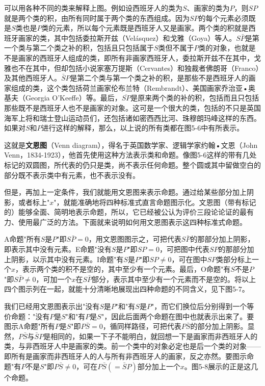 可以用各种不同的类来解释上图。例如设西班牙人的类为$S$、画家的类为$P$，则$SP$就是两个类的积，由所有同时属于两个类的东西组成。因为$SP$的每个元素必须既是$S$类也是$P$类的元素，所以每个元素既是西班牙人又是画家。两个类的积就是西班牙画家的类，其中包括委拉斯开兹（Velásquez）和戈雅（Goya）等人。$S\bar{P}$是第一个类与第二个类之补的积，包括且只包括属于$S$类但不属于$P$类的对象，也就是不是画家的西班牙人组成的类，即所有非画家西班牙人，委拉斯开兹不在其中，戈雅也不在其中，但却包括小说家塞万提斯（Cervantes）和独裁者佛朗哥（Franco）及其他西班牙人。$\bar{S}P$是第二个类与第一个类之补的积，是那些不是西班牙人的画家组成的类，这个类包括荷兰画家伦布兰特（Rembrandt）、美国画家乔治亚•奥基夫（Georgia O'Keeffe）等。最后，$\overline{SP}$是原来两个类的补的积，包括而且只包括那些既不是西班牙人也不是画家的对象。这可是一个很大的类，包括的不只是英国海军上将和瑞士登山运动员们，还包括诸如密西西比河、珠穆朗玛峰这样的东西。如果对$S$和$P$进行这样的解释，那么，以上说的所有类都在图5-6中有所表示。

这就是\textbf{文恩图}（Venn diagram），得名于英国数学家、逻辑学家约翰•文恩（John Venn，1834-1923），他首先使用这种方法表示类和命题。像图5-6这样的带有几处标记的双圆图，所代表的仍只是类，尚不表示任何命题。整个圆或其中留做空白的部分既不表示类中有元素，也不表示没有。

但是，再加上一定条件，我们就能用文恩图来表示命题。通过给某些部分加上阴影，或者标上"$x$"，就能准确地将四种标准式直言命题图示化。文恩图（带有标记的）能够全面、简明地表示命题，所以，它已经被公认为评价三段论论证的最有力、使用最广泛的方法。下面就来说明如何用文恩图表示这四种标准式命题。

A命题"所有$S$是$P$"即$S\bar{P}=0$，用文恩图图示之，可把代表$S\bar{P}$的那部分加上阴影，即表示其中没有元素。E命题"没有$S$是$P$"即$SP=0$，可把图中代表$SP$的那部分加上阴影，以示其中没有元素。I命题"有$S$是$P$"即$SP \neq 0$，可在图中$SP$类部分标上一个$x$，表示两个类的积不是空的，其中至少有一个元素。最后，O命题"有$S$不是$P$"即$S\bar{P} \neq 0$，可加一个$x$在$S\bar{P}$部分，表示其中至少有一个元素而不是空的。将以上四个图示列在一起，就能十分清晰地展现出四种命题的不同含义，见下图5-7。

我们已经用文恩图表示出"没有$S$是$P$"和"有$S$是$P$"，而它们换位后分别得到一个等价命题："没有$P$是$S$"和"有$P$是$S$"，因此后面两个命题在图中也就表示出来了。要图示A命题"所有$P$是$S$"即$P\bar{S}=0$，循同样路径，可把代表$P\bar{S}$的部分加上阴影。显然，$P\bar{S}$与$\bar{S}P$是相同的，如果一下子不能明白，就回想一下是画家而非西班牙人的类，与非西班牙人中是画家的类。前一个类中的对象必定也是后一个类的对象——即所有是画家而非西班牙人的人与所有非西班牙人的画家，反之亦然。要图示命题"有$P$不是$S$"即$P\bar{S} \neq 0$，可在$P\bar{S}(=\bar{S}P)$部分加上一个$x$。图5-8展示的正是这几个命题。

